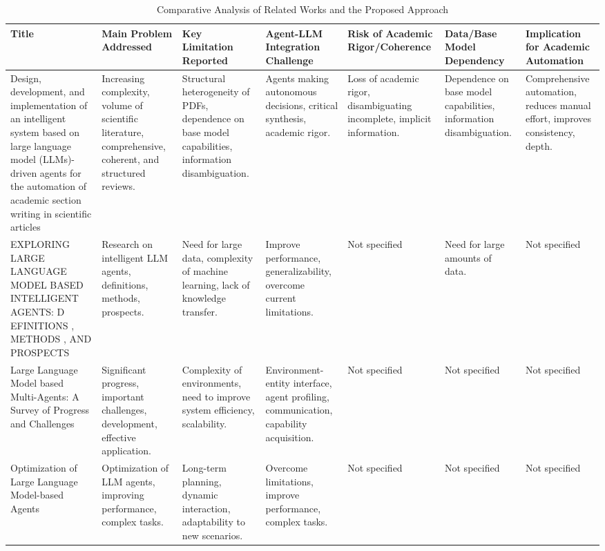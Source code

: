 \begin{table}[h]
    \centering
    \caption{Comparative Analysis of Related Works and the Proposed Approach}
    \label{tab:related_works_comparison}
    \footnotesize %
    \begin{tabular}{|p{3.5cm}|p{3.5cm}|p{3.5cm}|p{3.5cm}|p{3.5cm}|p{3.5cm}|p{3.5cm}|}
        \hline
        \textbf{Title} & \textbf{Main Problem Addressed} & \textbf{Key Limitation Reported} & \textbf{Agent-LLM Integration Challenge} & \textbf{Risk of Academic Rigor/Coherence} & \textbf{Data/Base Model Dependency} & \textbf{Implication for Academic Automation} \\
        \hline
        Design, development, and implementation of an intelligent system based on large language model (LLMs)-driven agents for the automation of academic section writing in scientific articles & Increasing complexity, volume of scientific literature, comprehensive, coherent, and structured reviews. & Structural heterogeneity of PDFs, dependence on base model capabilities, information disambiguation. & Agents making autonomous decisions, critical synthesis, academic rigor. & Loss of academic rigor, disambiguating incomplete, implicit information. & Dependence on base model capabilities, information disambiguation. & Comprehensive automation, reduces manual effort, improves consistency, depth. \\
        \hline
        EXPLORING LARGE LANGUAGE MODEL BASED INTELLIGENT AGENTS: D EFINITIONS , METHODS , AND PROSPECTS \cite{ref-1} & Research on intelligent LLM agents, definitions, methods, prospects. & Need for large data, complexity of machine learning, lack of knowledge transfer. & Improve performance, generalizability, overcome current limitations. & Not specified & Need for large amounts of data. & Not specified \\
        \hline
        Large Language Model based Multi-Agents: A Survey of Progress and Challenges \cite{ref-2} & Significant progress, important challenges, development, effective application. & Complexity of environments, need to improve system efficiency, scalability. & Environment-entity interface, agent profiling, communication, capability acquisition. & Not specified & Not specified & Not specified \\
        \hline
        Optimization of Large Language Model-based Agents \cite{ref-3} & Optimization of LLM agents, improving performance, complex tasks. & Long-term planning, dynamic interaction, adaptability to new scenarios. & Overcome limitations, improve performance, complex tasks. & Not specified & Not specified & Not specified \\

\end{tabular}
\end{table}
